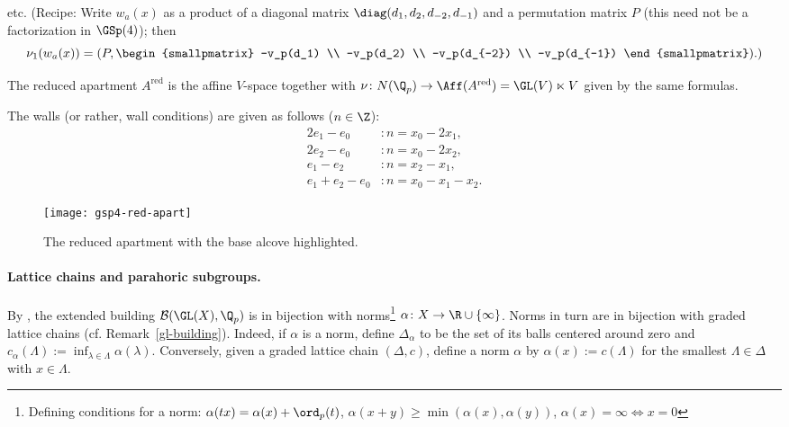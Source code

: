 \documentclass[a4paper]{scrartcl} %
\numberwithin{equation}{section}
\begin{document}
etc. (Recipe: Write $w_a(x)$ as a product of a diagonal matrix $\diag(d_1,d_2,d_{-2},d_{-1})$ and a permutation matrix $P$ (this need not be a factorization in $\GSp(4)$); then
\begin{equation*}
\nu_1(w_a(x))=(P,
\begin{smallpmatrix}
  -v_p(d_1) \\
  -v_p(d_2) \\
  -v_p(d_{-2}) \\
  -v_p(d_{-1})
\end{smallpmatrix}
).)
\end{equation*}


The reduced apartment $A^\mathrm{red}$ is the affine $V$-space together with $\nu\colon N(\Q_p)\to \Aff(A^\mathrm{red})=\GL(V)\ltimes V$ given by the same formulas.

The walls (or rather, wall conditions) are given as follows ($n\in\Z$):
\begin{align*}
  2e_1-e_0 &: n=x_0-2x_1, \\
  2e_2-e_0 &: n=x_0-2x_2, \\
  e_1-e_2 &: n=x_2-x_1, \\
  e_1+e_2-e_0 &: n=x_0-x_1-x_2.
\end{align*}

\begin{figure}
  \caption{The reduced apartment with the base alcove highlighted.}\label{fig:red-apt}
  \centering
  \texttt{[image: gsp4-red-apart]}
\end{figure}


\paragraph{Lattice chains and parahoric subgroups.}
\label{sec:lattice-chains}

By \cite{zbMATH03900941}, the extended building $\mathcal{B}(\GL(X),\Q_p)$ is in bijection with norms\footnote{Defining conditions for a norm: $\alpha(tx)=\alpha(x)+\ord_p(t)$, $\alpha(x+y)\geq \min(\alpha(x),\alpha(y))$, $\alpha(x)=\infty \iff x=0$} $\alpha\colon X\to \R\cup \{\infty\}$. Norms in turn are in bijection with graded lattice chains (cf. Remark~\ref{gl-building}). Indeed, if $\alpha$ is a norm, define $\Delta_\alpha$ to be the set of its balls centered around zero and $c_\alpha(\Lambda):=\inf_{\lambda\in\Lambda}\alpha(\lambda)$. Conversely, given a graded lattice chain $(\Delta,c)$, define a norm $\alpha$ by $\alpha(x):=c(\Lambda)$ for the smallest $\Lambda\in\Delta$ with $x\in\Lambda$.
\end{document}

